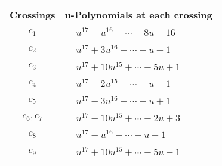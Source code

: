 \documentclass[1p]{elsarticle_modified}
\theoremstyle{definition}
\begin{document}
\begin{tabular}{m{50pt}|m{274pt}}
Crossings & \hspace{64pt}u-Polynomials at each crossing \\
\hline $$\begin{aligned}c_{1}\end{aligned}$$&$\begin{aligned}
&u^{17}- u^{16}+\cdots-8 u-16
\end{aligned}$\\
\hline $$\begin{aligned}c_{2}\end{aligned}$$&$\begin{aligned}
&u^{17}+3 u^{16}+\cdots+u-1
\end{aligned}$\\
\hline $$\begin{aligned}c_{3}\end{aligned}$$&$\begin{aligned}
&u^{17}+10 u^{15}+\cdots-5 u+1
\end{aligned}$\\
\hline $$\begin{aligned}c_{4}\end{aligned}$$&$\begin{aligned}
&u^{17}-2 u^{15}+\cdots+u-1
\end{aligned}$\\
\hline $$\begin{aligned}c_{5}\end{aligned}$$&$\begin{aligned}
&u^{17}-3 u^{16}+\cdots+u+1
\end{aligned}$\\
\hline $$\begin{aligned}c_{6},c_{7}\end{aligned}$$&$\begin{aligned}
&u^{17}-10 u^{15}+\cdots-2 u+3
\end{aligned}$\\
\hline $$\begin{aligned}c_{8}\end{aligned}$$&$\begin{aligned}
&u^{17}- u^{16}+\cdots+u-1
\end{aligned}$\\
\hline $$\begin{aligned}c_{9}\end{aligned}$$&$\begin{aligned}
&u^{17}+10 u^{15}+\cdots-5 u-1
\end{aligned}$\\

\end{tabular}
\end{document}
